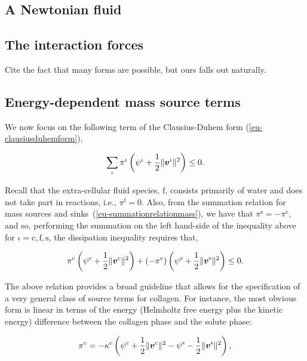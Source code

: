 \subsection{A Newtonian fluid}
\label{eu-newtonian-fluid}

\subsection{The interaction forces}
\label{eu-forces-between-phases}

Cite the fact that many forms are possible, but ours falls out
naturally.

\subsection{Energy-dependent mass source terms}
\label{eu-energy-dependent-source}

We now focus on the following term of the Clausius-Duhem form
(\ref{eu-clausiusduhemform}),

\begin{equation*}
\sum\limits_{\iota} 
 \pi^{\iota} \left(\psi^{\iota}+\frac{1}{2}
\Vert\mbox{\boldmath$ v$}^\iota\Vert^2\right) \leq 0.
\end{equation*}

Recall that the extra-cellular fluid species, $\mathrm{f}$, consists
primarily of water and does not take part in reactions, i.e.,
$\pi^\mathrm{f} = 0$. Also, from the summation relation for mass
sources and sinks~(\ref{eu-summationrelationmass}), we have that
$\pi^\mathrm{s} = - \pi^\mathrm{c}$, and so, performing the summation
on the left hand-side of the inequality above for
$\iota=\mathrm{c,f,s}$, the dissipation inequality requires that,

\begin{equation*}
 \pi^{\mathrm{c}} \left(\psi^{\mathrm{c}}+\frac{1}{2}
\Vert\mbox{\boldmath$ v$}^{\mathrm{c}}\Vert^2\right)
+ \left(-\pi^{\mathrm{c}}\right) \left(\psi^{\mathrm{s}}+\frac{1}{2}
\Vert\mbox{\boldmath$ v$}^{\mathrm{s}}\Vert^2\right) \leq 0.
\end{equation*}

\noindent The above relation provides a broad guideline that allows
for the specification of a very general class of source terms for
collagen. For instance, the most obvious form is linear in terms of
the energy (Helmholtz free energy plus the kinetic energy) difference
between the collagen phase and the solute phase:

\begin{equation}
 \pi^{\mathrm{c}} = -\kappa^{\mathrm{c}}
 \left(\psi^{\mathrm{c}}+\frac{1}{2} \Vert\mbox{\boldmath$ v$}^{\mathrm{c}}\Vert^2 -
 \psi^{\mathrm{s}}-\frac{1}{2} \Vert\mbox{\boldmath$ v$}^{\mathrm{s}}\Vert^2\right),
\label{eu-energy-source-linear}
\end{equation}

